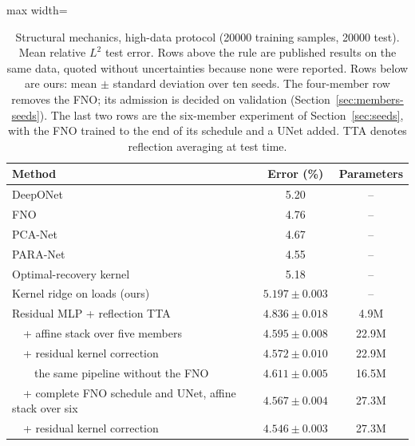 \documentclass[twoside,11pt]{article}
\newcommand{\errPipe}{4.572}         %
\newcommand{\errPipeSd}{0.010}       %
\newcommand{\errStack}{4.595}        %
\newcommand{\errStackSd}{0.008}
\newcommand{\errPipeFour}{4.611}     %
\newcommand{\errPipeFourSd}{0.005}
\newcommand{\errSix}{4.546}          %
\newcommand{\errSixSd}{0.003}
\newcommand{\errSixStack}{4.567}     %
\newcommand{\errSixStackSd}{0.004}
\newcommand{\errMLP}{4.836}          %
\newcommand{\errMLPSd}{0.018}
\newcommand{\errKRRload}{5.197}      %
\newcommand{\errKRRloadSd}{0.003}
\begin{document}
\begin{table}[t]
\centering

\begin{adjustbox}{max width=\linewidth}
\begin{tabular}{lcc}
\toprule
Method & Error (\%) & Parameters \\
\midrule
DeepONet \citep{dehoop2022cost} & 5.20 & -- \\
FNO \citep{dehoop2022cost} & 4.76 & -- \\
PCA-Net \citep{dehoop2022cost} & 4.67 & -- \\
PARA-Net \citep{dehoop2022cost} & 4.55 & -- \\
Optimal-recovery kernel \citep{batlle2024kernel} & 5.18 & -- \\
\midrule
Kernel ridge on loads (ours) & $\errKRRload\pm\errKRRloadSd$ & -- \\
Residual MLP + reflection TTA & $\errMLP\pm\errMLPSd$ & 4.9M \\
\ \ + affine stack over five members & $\errStack\pm\errStackSd$ & 22.9M \\
\ \ + residual kernel correction & $\errPipe\pm\errPipeSd$ & 22.9M \\
\ \ \ \ the same pipeline without the FNO & $\errPipeFour\pm\errPipeFourSd$ & 16.5M \\
\ \ + complete FNO schedule and UNet, affine stack over six & $\errSixStack\pm\errSixStackSd$ & 27.3M \\
\ \ + residual kernel correction & $\errSix\pm\errSixSd$ & 27.3M \\
\bottomrule
\end{tabular}
\end{adjustbox}
\caption{Structural mechanics, high-data protocol (20000 training samples,
20000 test). Mean relative $L^2$ test error. Rows above the rule are
published results on the same data, quoted without uncertainties because none
were reported. Rows below are ours: mean $\pm$ standard deviation over ten
seeds. The four-member row removes the FNO; its admission is decided on
validation (Section~\ref{sec:members-seeds}). The last two rows are the six-member experiment
of Section~\ref{sec:seeds}, with the FNO trained to the end of its schedule
and a UNet added. TTA denotes reflection averaging at test time.}
\label{tab:main}
\end{table}
\end{document}
